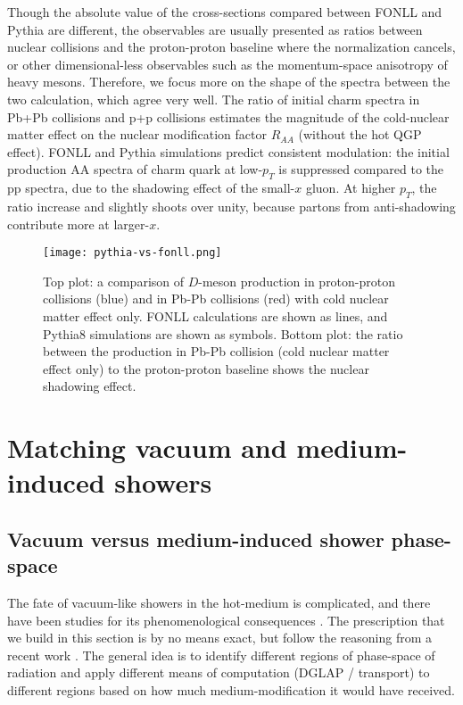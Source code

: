 Though the absolute value of the cross-sections compared between FONLL and Pythia are different, the observables are usually presented as ratios between nuclear collisions and the proton-proton baseline where the normalization cancels, or other dimensional-less observables such as the momentum-space anisotropy of heavy mesons.
Therefore, we focus more on the shape of the spectra between the two calculation, which agree very well.
The ratio of initial charm spectra in Pb+Pb collisions and p+p collisions estimates the magnitude of the cold-nuclear matter effect on the nuclear modification factor $R_{AA}$ (without the hot QGP effect).
FONLL and Pythia simulations predict consistent modulation: the initial production AA spectra of charm quark at low-$p_T$ is suppressed compared to the pp spectra, due to the shadowing effect of the small-$x$ gluon. 
At higher $p_T$, the ratio increase and slightly shoots over unity, because partons from anti-shadowing contribute more at larger-$x$.

\begin{figure}
\singlespacing
\centering
\texttt{[image: pythia-vs-fonll.png]}
\caption[Top plot: a comparison of $D$-meson production in proton-proton]{Top plot: a comparison of $D$-meson production in proton-proton collisions (blue) and in Pb-Pb collisions (red) with cold nuclear matter effect only. FONLL calculations are shown as lines, and Pythia8 simulations are shown as symbols. Bottom plot: the ratio between the production in Pb-Pb collision (cold nuclear matter effect only) to the proton-proton baseline shows the nuclear shadowing effect.}
\label{fig:pythia-fonll}
\end{figure}

\section{Matching vacuum and medium-induced showers}
\subsection{Vacuum versus medium-induced shower phase-space}
\label{section:match}
The fate of vacuum-like showers in the hot-medium is complicated, and there have been studies for its phenomenological consequences \cite{Cao:2017zih,PhysRevLett.120.232001,PhysRevLett.120.232001,Caucal:2018ofz}.
The prescription that we build in this section is by no means exact, but follow the reasoning from a recent work \cite{PhysRevLett.120.232001}.
The general idea is to identify different regions of phase-space of radiation and apply different means of computation (DGLAP / transport) to different regions based on how much medium-modification it would have received.

